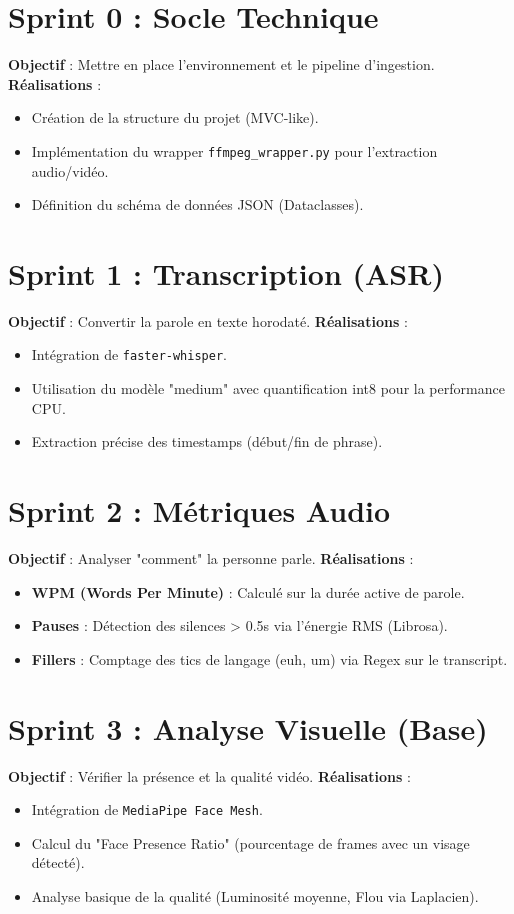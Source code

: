 \section{Sprint 0 : Socle Technique}
\textbf{Objectif} : Mettre en place l'environnement et le pipeline d'ingestion.
\textbf{Réalisations} :
\begin{itemize}
    \item Création de la structure du projet (MVC-like).
    \item Implémentation du wrapper \texttt{ffmpeg\_wrapper.py} pour l'extraction audio/vidéo.
    \item Définition du schéma de données JSON (Dataclasses).
\end{itemize}

\section{Sprint 1 : Transcription (ASR)}
\textbf{Objectif} : Convertir la parole en texte horodaté.
\textbf{Réalisations} :
\begin{itemize}
    \item Intégration de \texttt{faster-whisper}.
    \item Utilisation du modèle "medium" avec quantification int8 pour la performance CPU.
    \item Extraction précise des timestamps (début/fin de phrase).
\end{itemize}

\section{Sprint 2 : Métriques Audio}
\textbf{Objectif} : Analyser "comment" la personne parle.
\textbf{Réalisations} :
\begin{itemize}
    \item \textbf{WPM (Words Per Minute)} : Calculé sur la durée active de parole.
    \item \textbf{Pauses} : Détection des silences > 0.5s via l'énergie RMS (Librosa).
    \item \textbf{Fillers} : Comptage des tics de langage (euh, um) via Regex sur le transcript.
\end{itemize}

\section{Sprint 3 : Analyse Visuelle (Base)}
\textbf{Objectif} : Vérifier la présence et la qualité vidéo.
\textbf{Réalisations} :
\begin{itemize}
    \item Intégration de \texttt{MediaPipe Face Mesh}.
    \item Calcul du "Face Presence Ratio" (pourcentage de frames avec un visage détecté).
    \item Analyse basique de la qualité (Luminosité moyenne, Flou via Laplacien).
\end{itemize}

